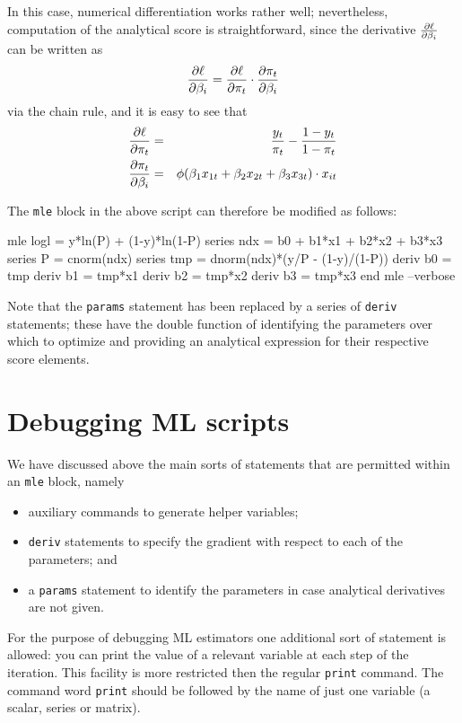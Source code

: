 In this case, numerical differentiation works rather well;
nevertheless, computation of the analytical score is straightforward,
since the derivative $\frac{\partial \ell}{\partial \beta_i}$ can be written as
\[
  \frac{\partial \ell}{\partial \beta_i} = \frac{\partial \ell}{\partial \pi_t} \cdot \frac{\partial \pi_t}{\partial \beta_i}
\]
via the chain rule, and it is easy to see that
\begin{eqnarray*}
  \frac{\partial \ell}{\partial \pi_t} & = & \frac{y_t}{\pi_t} - \frac{1 - y_t}{1 -
    \pi_t} \\
  \frac{\partial \pi_t}{\partial \beta_i} & = & \phi(\beta_1 x_{1t} + \beta_2 x_{2t} +
  \beta_3 x_{3t}) \cdot x_{it}
\end{eqnarray*}

The \texttt{mle} block in the above script can therefore be modified
as follows:
%
\begin{code}
mle logl = y*ln(P) + (1-y)*ln(1-P)
  series ndx = b0 + b1*x1 + b2*x2 + b3*x3
  series P = cnorm(ndx)
  series tmp = dnorm(ndx)*(y/P - (1-y)/(1-P))
  deriv b0 = tmp
  deriv b1 = tmp*x1
  deriv b2 = tmp*x2
  deriv b3 = tmp*x3
end mle --verbose
\end{code}

Note that the \texttt{params} statement has been replaced by a series
of \texttt{deriv} statements; these have the double function of
identifying the parameters over which to optimize and providing an
analytical expression for their respective score elements.

\section{Debugging ML scripts}
\label{sec:mle-debug}

We have discussed above the main sorts of statements that are
permitted within an \texttt{mle} block, namely 
%
\begin{itemize}
\item auxiliary commands to generate helper variables;
\item \texttt{deriv} statements to specify the gradient with respect
  to each of the parameters; and
\item a \texttt{params} statement to identify the parameters in case
  analytical derivatives are not given.
\end{itemize}

For the purpose of debugging ML estimators one additional sort of
statement is allowed: you can print the value of a relevant variable
at each step of the iteration.  This facility is more restricted then
the regular \texttt{print} command.  The command word \texttt{print}
should be followed by the name of just one variable (a scalar, series
or matrix).

